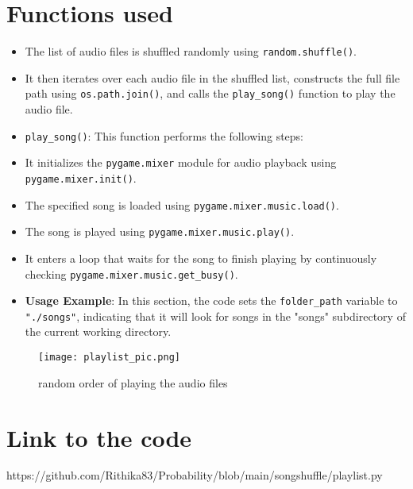 \documentclass{article}
\begin{document}
\section{Functions used}   
        \begin{itemize}
           
        
                \item The list of audio files is shuffled randomly using \texttt{random.shuffle()}.
                \item It then iterates over each audio file in the shuffled list, constructs the full file path using \texttt{os.path.join()}, and calls the \texttt{play\_song()} function to play the audio file.
               
            \end{itemize}
       \begin{itemize}   
            \item \texttt{play\_song()}: This function performs the following steps:
            
                \item It initializes the \texttt{pygame.mixer} module for audio playback using \texttt{pygame.mixer.init()}.
                \item The specified song is loaded using \texttt{pygame.mixer.music.load()}.
                \item The song is played using \texttt{pygame.mixer.music.play()}.
                \item It enters a loop that waits for the song to finish playing by continuously checking \texttt{pygame.mixer.music.get\_busy()}.
            \end{itemize}
\begin{itemize}  
    \item \textbf{Usage Example}: In this section, the code sets the \texttt{folder\_path} variable to \texttt{"./songs"}, indicating that it will look for songs in the "songs" subdirectory of the current working directory.
     \end{itemize}
     
     \clearpage     
     
\begin{figure}[t!]
  \centering
  \texttt{[image: playlist\_pic.png]}
  \caption{random order of playing the audio files}
  \label{fig:playlist}
\end{figure}
     
\section{Link to the code}  
     https://github.com/Rithika83/Probability/blob/main/songshuffle/playlist.py
\end{document}
